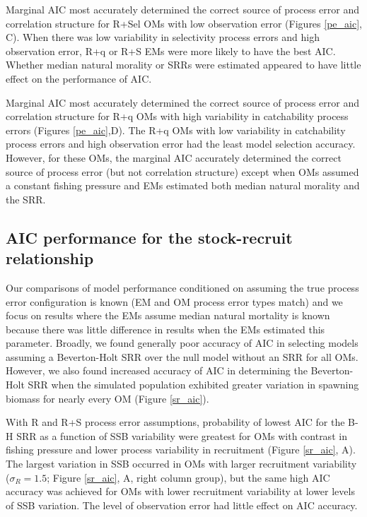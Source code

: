\documentclass[
  12pt,
]{article}
\begin{document}
Marginal AIC most accurately determined the correct source of process
error and correlation structure for R+Sel OMs with low observation error
(Figures \ref{pe_aic}, C). When there was low variability in selectivity
process errors and high observation error, R+q or R+S EMs were more
likely to have the best AIC. Whether median natural morality or SRRs
were estimated appeared to have little effect on the performance of AIC.

Marginal AIC most accurately determined the correct source of process
error and correlation structure for R+q OMs with high variability in
catchability process errors (Figures \ref{pe_aic},D). The R+q OMs with
low variability in catchability process errors and high observation
error had the least model selection accuracy. However, for these OMs,
the marginal AIC accurately determined the correct source of process
error (but not correlation structure) except when OMs assumed a constant
fishing pressure and EMs estimated both median natural morality and the
SRR.

\hypertarget{aic-performance-for-the-stock-recruit-relationship}{%
\subsection*{AIC performance for the stock-recruit
relationship}\label{aic-performance-for-the-stock-recruit-relationship}}

Our comparisons of model performance conditioned on assuming the true
process error configuration is known (EM and OM process error types
match) and we focus on results where the EMs assume median natural
mortality is known because there was little difference in results when
the EMs estimated this parameter. Broadly, we found generally poor
accuracy of AIC in selecting models assuming a Beverton-Holt SRR over
the null model without an SRR for all OMs. However, we also found
increased accuracy of AIC in determining the Beverton-Holt SRR when the
simulated population exhibited greater variation in spawning biomass for
nearly every OM (Figure \ref{sr_aic}).

With R and R+S process error assumptions, probability of lowest AIC for
the B-H SRR as a function of SSB variability were greatest for OMs with
contrast in fishing pressure and lower process variability in
recruitment (Figure \ref{sr_aic}, A). The largest variation in SSB
occurred in OMs with larger recruitment variability (\(\sigma_R = 1.5\);
Figure \ref{sr_aic}, A, right column group), but the same high AIC
accuracy was achieved for OMs with lower recruitment variability at
lower levels of SSB variation. The level of observation error had little
effect on AIC accuracy.
\end{document}
